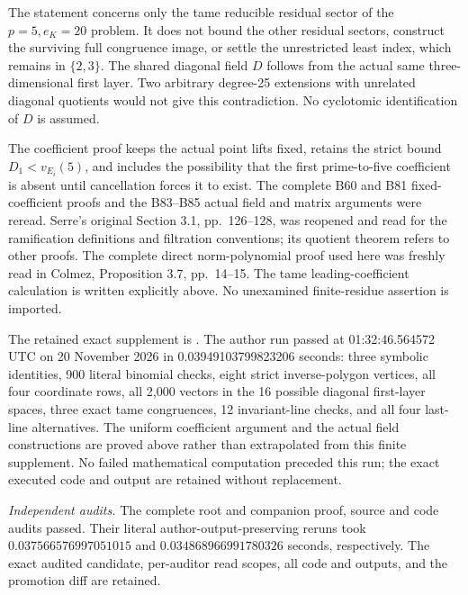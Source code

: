 \begin{remark}
\label{rem:B-RD87-scope}
The statement concerns only the tame reducible
residual sector of the \(p=5,e_K=20\) problem.
It does not bound the other residual sectors,
construct the surviving full congruence image,
or settle the unrestricted least index, which
remains in \(\{2,3\}\).
The shared diagonal field \(D\) follows from
the actual same three-dimensional first layer.
Two arbitrary degree-25 extensions with
unrelated diagonal quotients would not give
this contradiction. No cyclotomic identification
of \(D\) is assumed.

The coefficient proof keeps the actual point
lifts fixed, retains the strict bound
\(D_1<v_{E_i}(5)\), and includes the possibility
that the first prime-to-five coefficient is
absent until cancellation forces it to exist.
The complete B60 and B81 fixed-coefficient
proofs and the B83--B85 actual field and
matrix arguments were reread. Serre's original
Section 3.1, pp.~126--128, was reopened and
read for the ramification definitions and
filtration conventions; its quotient theorem
refers to other proofs. The complete direct
norm-polynomial proof used here was freshly
read in Colmez, Proposition 3.7, pp.~14--15.
The tame leading-coefficient calculation is
written explicitly above. No unexamined
finite-residue assertion is imported.

The retained exact supplement is
.
The author run passed at 01:32:46.564572 UTC on
20 November 2026 in 0.03949103799823206 seconds:
three symbolic identities, 900 literal binomial
checks, eight strict inverse-polygon vertices,
all four coordinate rows, all 2,000 vectors in
the 16 possible diagonal first-layer spaces,
three exact tame congruences, 12 invariant-line
checks, and all four last-line alternatives.
The uniform coefficient argument and the actual
field constructions are proved above rather
than extrapolated from this finite supplement.
No failed mathematical computation preceded
this run; the exact executed code and output
are retained without replacement.

\smallskip
\noindent\emph{Independent audits.}
The complete root and companion proof, source and code audits passed.
Their literal author-output-preserving reruns took
\(0.037566576997051015\) and
\(0.034868966991780326\) seconds, respectively.
The exact audited candidate, per-auditor read scopes,
all code and outputs, and the promotion diff are retained.
\end{remark}
